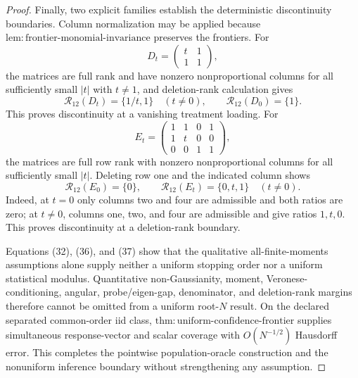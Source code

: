 \documentclass{article}
\begin{document}
\begin{proof}
Finally, two explicit families establish the deterministic discontinuity boundaries. Column normalization may be applied because \(\mathrm{lem{:}frontier\text{-}monomial\text{-}invariance}\) preserves the frontiers. For
\[
 D_t=\begin{pmatrix}t&1\\1&1\end{pmatrix},
\]
the matrices are full rank and have nonzero nonproportional columns for all sufficiently small \(|t|\) with \(t\ne1\), and deletion-rank calculation gives
\[
 \mathcal R_{12}(D_t)=\{1/t,1\}\quad(t\ne0),
 \qquad
 \mathcal R_{12}(D_0)=\{1\}. \tag{36}
\]
This proves discontinuity at a vanishing treatment loading. For
\[
 E_t=
 \begin{pmatrix}
 1&1&0&1\\
 1&t&0&0\\
 0&0&1&1
 \end{pmatrix},
\]
the matrices are full row rank with nonzero nonproportional columns for all sufficiently small \(|t|\). Deleting row one and the indicated column shows
\[
 \mathcal R_{12}(E_0)=\{0\},
 \qquad
 \mathcal R_{12}(E_t)=\{0,t,1\}\quad(t\ne0). \tag{37}
\]
Indeed, at \(t=0\) only columns two and four are admissible and both ratios are zero; at \(t\ne0\), columns one, two, and four are admissible and give ratios \(1,t,0\). This proves discontinuity at a deletion-rank boundary.

Equations (32), (36), and (37) show that the qualitative all-finite-moments assumptions alone supply neither a uniform stopping order nor a uniform statistical modulus. Quantitative non-Gaussianity, moment, Veronese-conditioning, angular, probe/eigen-gap, denominator, and deletion-rank margins therefore cannot be omitted from a uniform root-\(N\) result. On the declared separated common-order iid class, \(\mathrm{thm{:}uniform\text{-}confidence\text{-}frontier}\) supplies simultaneous response-vector and scalar coverage with \(O(N^{-1/2})\) Hausdorff error. This completes the pointwise population-oracle construction and the nonuniform inference boundary without strengthening any assumption.
\end{proof}
\end{document}
